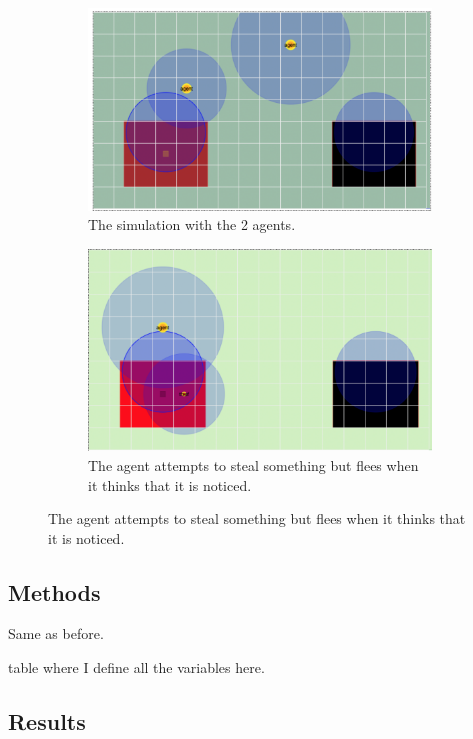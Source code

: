 \begin{figure}[htbp]
\begin{subfigure}{.5\textwidth}
\includegraphics[width=\linewidth]{images/sim1.png}
\caption{The simulation with the 2 agents.}
\end{subfigure}
\begin{subfigure}{.5\textwidth}
\includegraphics[width=\linewidth]{images/stealing.png}
\caption{The agent attempts to steal something but flees when it thinks that it is noticed.}
\end{subfigure}
\end{figure}

\subsection{Methods}

Same as before. 

table where I define all the variables here.

\subsection{Results}

